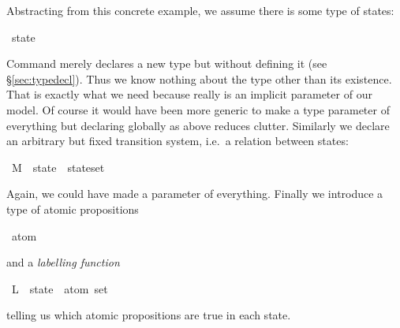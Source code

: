 \begin{isabellebody}
\begin{isamarkuptext}
Abstracting from this concrete example, we assume there is some type of
states:%
\end{isamarkuptext}%
\ state%
\begin{isamarkuptext}%
\noindent
Command  merely declares a new type but without
defining it (see \S\ref{sec:typedecl}). Thus we know nothing
about the type other than its existence. That is exactly what we need
because  really is an implicit parameter of our model.  Of
course it would have been more generic to make  a type
parameter of everything but declaring  globally as above
reduces clutter.  Similarly we declare an arbitrary but fixed
transition system, i.e.\ a relation between states:%
\end{isamarkuptext}%
\ M\ {\isacharcolon}{\isacharcolon}\ {\isachardoublequote}{\isacharparenleft}state\ {\isasymtimes}\ state{\isacharparenright}set{\isachardoublequote}%
\begin{isamarkuptext}%
\noindent
Again, we could have made  a parameter of everything.
Finally we introduce a type of atomic propositions%
\end{isamarkuptext}%
\ atom%
\begin{isamarkuptext}%
\noindent
and a \emph{labelling function}%
\end{isamarkuptext}%
\ L\ {\isacharcolon}{\isacharcolon}\ {\isachardoublequote}state\ {\isasymRightarrow}\ atom\ set{\isachardoublequote}%
\begin{isamarkuptext}%
\noindent
telling us which atomic propositions are true in each state.%
\end{isamarkuptext}%
\end{isabellebody}%
